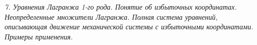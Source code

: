 \emph{7. Уравнения Лагранжа 1-го рода. Понятие об избыточных координатах.
Неопределенные множители Лагранжа. Полная система уравнений, описывающая
движение механической системы с избыточными координатами. Примеры применения.}

\newpage
